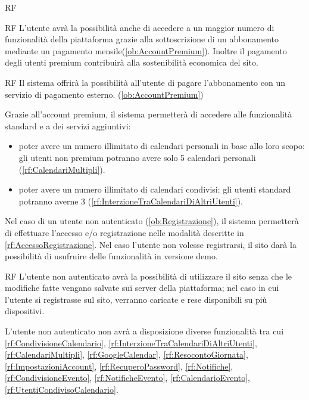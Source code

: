 \begin{listaPersonale}{RF}
\begin{listaPersonale2}{RF}
		 L'utente avrà la possibilità anche di accedere a un maggior numero di funzionalità della piattaforma grazie alla sottoscrizione di un abbonamento mediante un pagamento mensile(\ref{ob:AccountPremium}). Inoltre il pagamento degli utenti premium contribuirà alla sostenibilità economica del sito.

		\begin{listaPersonale3}{RF}
			 Il sistema offrirà la possibilità all'utente di pagare l'abbonamento con un servizio di pagamento esterno. (\ref{ob:AccountPremium})

			 Grazie all'account premium, il sistema permetterà di accedere alle funzionalità standard e a dei servizi aggiuntivi:
			\begin{itemize}
				\item poter avere un numero illimitato di calendari personali in base allo loro scopo: gli utenti non premium potranno avere solo 5 calendari personali (\ref{rf:CalendariMultipli}).
				\item poter avere un numero illimitato di calendari condivisi: gli utenti standard potranno averne 3 (\ref{rf:InterzioneTraCalendariDiAltriUtenti}).
			\end{itemize}

		\end{listaPersonale3}
	\end{listaPersonale2}

	 Nel caso di un utente non autenticato (\ref{ob:Registrazione}), il sistema permetterà di effettuare l'accesso e/o registrazione nelle modalità descritte in \ref{rf:AccessoRegistrazione}. Nel caso l'utente non volesse registrarsi, il sito darà la possibilità di usufruire delle funzionalità in versione demo.

	\begin{listaPersonale2}{RF}
			L'utente non autenticato avrà la possibilità di utilizzare il sito senza che le modifiche fatte vengano salvate sui server della piattaforma; nel caso in cui l'utente si registrasse sul sito, verranno caricate e rese disponibili su più dispositivi.

		\begin{listaPersonale3}{}
 L'utente non autenticato non avrà a disposizione diverse funzionalità tra cui \ref{rf:CondivisioneCalendario}, \ref{rf:InterzioneTraCalendariDiAltriUtenti}, \ref{rf:CalendariMultipli}, \ref{rf:GoogleCalendar}, \ref{rf:ResocontoGiornata}, \ref{rf:ImpostazioniAccount}, \ref{rf:RecuperoPassword}, \ref{rf:Notifiche}, \ref{rf:CondivisioneEvento}, \ref{rf:NotificheEvento}, \ref{rf:CalendarioEvento}, \ref{rf:UtentiCondivisoCalendario}.
		\end{listaPersonale3}
	\end{listaPersonale2}


\end{listaPersonale}
